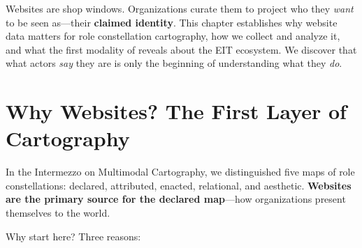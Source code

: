 \documentclass[../main.tex]{subfiles}
\begin{document}

\begin{center}
\end{center}

\vspace{0.5cm}

\begin{chapteroverview}
Websites are shop windows. Organizations curate them to project who they \emph{want} to be seen as---their \textbf{claimed identity}. This chapter establishes why website data matters for role constellation cartography, how we collect and analyze it, and what the first modality of \RoleBox reveals about the EIT ecosystem. We discover that what actors \emph{say} they are is only the beginning of understanding what they \emph{do}.
\end{chapteroverview}


\section*{Why Websites? The First Layer of Cartography}

In the Intermezzo on Multimodal Cartography, we distinguished five maps of role constellations: declared, attributed, enacted, relational, and aesthetic. \textbf{Websites are the primary source for the declared map}---how organizations present themselves to the world.


Why start here? Three reasons:
\end{document}
